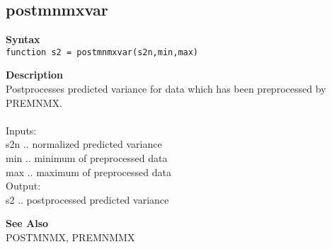 \subsection*{postmnmxvar} \label{fun:postmnmxvar}


\textbf{Syntax}
\\  \texttt{function s2 = postmnmxvar(s2n,min,max)}

\textbf{Description}
\\ Postprocesses predicted variance for data which has been preprocessed by
 PREMNMX.
 \\
\\ Inputs:
\\ s2n .. normalized predicted variance
\\ min .. minimum of preprocessed data
\\ max .. maximum of preprocessed data
\\ Output:
\\ s2 .. postprocessed predicted variance

\textbf{See Also}
\\ POSTMNMX, PREMNMMX
